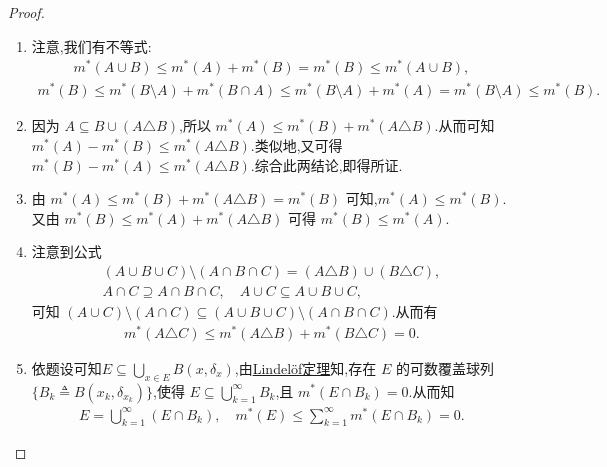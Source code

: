 \documentclass[../../main.tex]{subfiles}%
\begin{document}
\begin{proof}
\begin{enumerate}[(1)]
\item 注意,我们有不等式:
\begin{align*}
m^*(A\cup B)\leqslant m^*(A)+m^*(B)=m^*(B)\leqslant m^*(A\cup B),
\end{align*}
\begin{align*}
m^*(B)\leqslant m^*(B\setminus A)+m^*(B\cap A)\leqslant m^*(B\setminus A)+m^*(A)=m^*(B\setminus A)\leqslant m^*(B).
\end{align*}

\item 因为 $A\subseteq B\cup(A\triangle B)$,所以 $m^*(A)\leqslant m^*(B)+m^*(A\triangle B)$.从而可知 $m^*(A)-m^*(B)\leqslant m^*(A\triangle B)$.类似地,又可得 $m^*(B)-m^*(A)\leqslant m^*(A\triangle B)$.综合此两结论,即得所证.

\item 由 $m^*(A)\leqslant m^*(B)+m^*(A\triangle B)=m^*(B)$ 可知,$m^*(A)\leqslant m^*(B)$.又由 $m^*(B)\leqslant m^*(A)+m^*(A\triangle B)$ 可得 $m^*(B)\leqslant m^*(A)$.

\item 注意到公式
\begin{align*}
(A\cup B\cup C)\setminus(A\cap B\cap C)=(A\triangle B)\cup(B\triangle C),\\
A\cap C\supseteq A\cap B\cap C,\quad A\cup C\subseteq A\cup B\cup C,
\end{align*}
可知 $(A\cup C)\setminus(A\cap C)\subseteq(A\cup B\cup C)\setminus(A\cap B\cap C)$.从而有
\begin{align*}
m^*(A\triangle C)\leqslant m^*(A\triangle B)+m^*(B\triangle C)=0.
\end{align*}
\item 依题设可知$E\subseteq \bigcup_{x\in E}{B\left( x,\delta _x \right)}$,由\hyperref[theorem:Lindelöf定理]{Lindelöf定理}知,存在 $E$ 的可数覆盖球列 $\{B_k\triangleq B(x_k,\delta_{x_k})\}$,使得 $E\subseteq\bigcup\limits_{k=1}^{\infty}B_k$,且 $m^*(E\cap B_k)=0$.从而知
\begin{align*}
E=\bigcup\limits_{k=1}^{\infty}(E\cap B_k),\quad m^*(E)\leqslant\sum\limits_{k=1}^{\infty}m^*(E\cap B_k)=0.
\end{align*}
\end{enumerate}

\end{proof}
\end{document}
